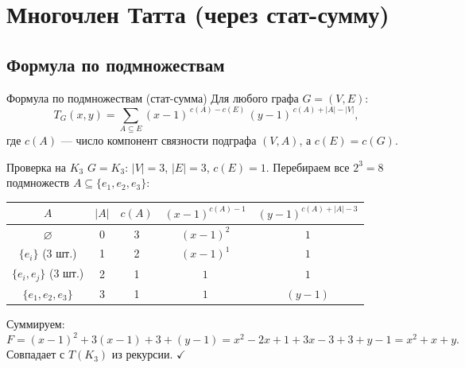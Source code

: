 \section{Многочлен Татта (через стат-сумму)}

\subsection{Формула по подмножествам}

\begin{Theorem}{Формула по подмножествам (стат-сумма)}{}
  Для любого графа $G=(V,E)$:
  \[
    T_G(x,y)
    = \sum_{A\subseteq E}
      (x-1)^{\,c(A)-c(E)}\,(y-1)^{\,c(A)+|A|-|V|},
  \]
  где $c(A)$ --- число компонент связности подграфа $(V,A)$,
  а $c(E)=c(G)$.
\end{Theorem}

\begin{Example}{Проверка на $K_3$}{}
  $G=K_3$: $|V|=3$, $|E|=3$, $c(E)=1$.
  Перебираем все $2^3=8$ подмножеств $A\subseteq\{e_1,e_2,e_3\}$:

  \medskip
  \begin{center}
  \begin{tabular}{c|c|c|c|c}
    $A$ & $|A|$ & $c(A)$ & $(x-1)^{c(A)-1}$ & $(y-1)^{c(A)+|A|-3}$\\\hline
    $\varnothing$   & 0 & 3 & $(x-1)^2$ & $1$ \\
    $\{e_i\}$ (3 шт.)       & 1 & 2 & $(x-1)^1$ & $1$ \\
    $\{e_i,e_j\}$ (3 шт.)   & 2 & 1 & $1$        & $1$ \\
    $\{e_1,e_2,e_3\}$        & 3 & 1 & $1$        & $(y-1)$\\
  \end{tabular}
  \end{center}

  \medskip\noindent
  Суммируем:
  \[
    F = (x-1)^2 + 3(x-1) + 3 + (y-1)
      = x^2-2x+1+3x-3+3+y-1
      = x^2+x+y.
  \]
  Совпадает с $T(K_3)$ из рекурсии. $\checkmark$
\end{Example}

